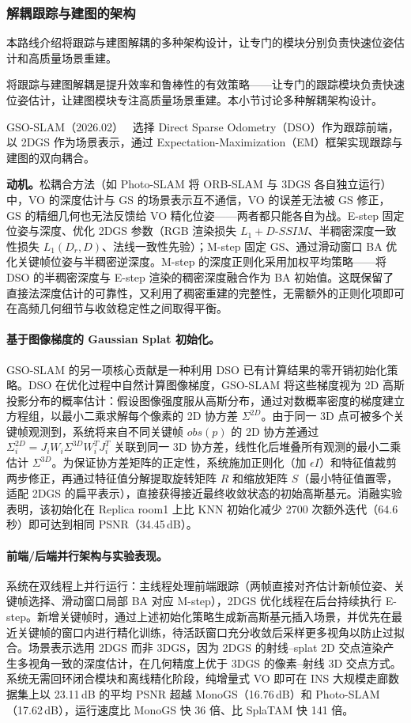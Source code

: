 \subsubsection{解耦跟踪与建图的架构}

本路线介绍将跟踪与建图解耦的多种架构设计，让专门的模块分别负责快速位姿估计和高质量场景重建。

将跟踪与建图解耦是提升效率和鲁棒性的有效策略——让专门的跟踪模块负责快速位姿估计，让建图模块专注高质量场景重建。本小节讨论多种解耦架构设计。

GSO-SLAM（2026.02）~\cite{2602_11714} 选择 Direct Sparse Odometry（DSO）作为跟踪前端，以 2DGS 作为场景表示，通过 Expectation-Maximization（EM）框架实现跟踪与建图的双向耦合。

\textbf{动机。}松耦合方法（如 Photo-SLAM 将 ORB-SLAM 与 3DGS 各自独立运行）中，VO 的深度估计与 GS 的场景表示互不通信，VO 的误差无法被 GS 修正，GS 的精细几何也无法反馈给 VO 精化位姿——两者都只能各自为战。E-step 固定位姿与深度、优化 2DGS 参数（RGB 渲染损失 $L_1 + D\text{-}SSIM$、半稠密深度一致性损失 $L_1(D_r, D)$、法线一致性先验）；M-step 固定 GS、通过滑动窗口 BA 优化关键帧位姿与半稠密逆深度。M-step 的深度正则化采用加权平均策略——将 DSO 的半稠密深度与 E-step 渲染的稠密深度融合作为 BA 初始值。这既保留了直接法深度估计的可靠性，又利用了稠密重建的完整性，无需额外的正则化项即可在高频几何细节与收敛稳定性之间取得平衡。

\paragraph{基于图像梯度的 Gaussian Splat 初始化。}
GSO-SLAM 的另一项核心贡献是一种利用 DSO 已有计算结果的零开销初始化策略。DSO 在优化过程中自然计算图像梯度，GSO-SLAM 将这些梯度视为 2D 高斯投影分布的概率估计：假设图像强度服从高斯分布，通过对数概率密度的梯度建立方程组，以最小二乘求解每个像素的 2D 协方差 $\Sigma^{2D}$。由于同一 3D 点可被多个关键帧观测到，系统将来自不同关键帧 $obs(p)$ 的 2D 协方差通过 $\Sigma^{2D}_i = J_i W_i \Sigma^{3D} W_i^T J_i^T$ 关联到同一 3D 协方差，线性化后堆叠所有观测的最小二乘估计 $\Sigma^{3D}$。为保证协方差矩阵的正定性，系统施加正则化（加 $\epsilon I$）和特征值裁剪两步修正，再通过特征值分解提取旋转矩阵 $R$ 和缩放矩阵 $S$（最小特征值置零，适配 2DGS 的扁平表示），直接获得接近最终收敛状态的初始高斯基元。消融实验表明，该初始化在 Replica room1 上比 KNN 初始化减少 2700 次额外迭代（64.6 秒）即可达到相同 PSNR（34.45\,dB）。

\paragraph{前端/后端并行架构与实验表现。}
系统在双线程上并行运行：主线程处理前端跟踪（两帧直接对齐估计新帧位姿、关键帧选择、滑动窗口局部 BA 对应 M-step），2DGS 优化线程在后台持续执行 E-step。新增关键帧时，通过上述初始化策略生成新高斯基元插入场景，并优先在最近关键帧的窗口内进行精化训练，待活跃窗口充分收敛后采样更多视角以防止过拟合。场景表示选用 2DGS 而非 3DGS，因为 2DGS 的射线--splat 2D 交点渲染产生多视角一致的深度估计，在几何精度上优于 3DGS 的像素--射线 3D 交点方式。系统无需回环闭合模块和离线精化阶段，纯增量式 VO 即可在 INS 大规模走廊数据集上以 23.11\,dB 的平均 PSNR 超越 MonoGS（16.76\,dB）和 Photo-SLAM（17.62\,dB），运行速度比 MonoGS 快 36 倍、比 SplaTAM 快 141 倍。

